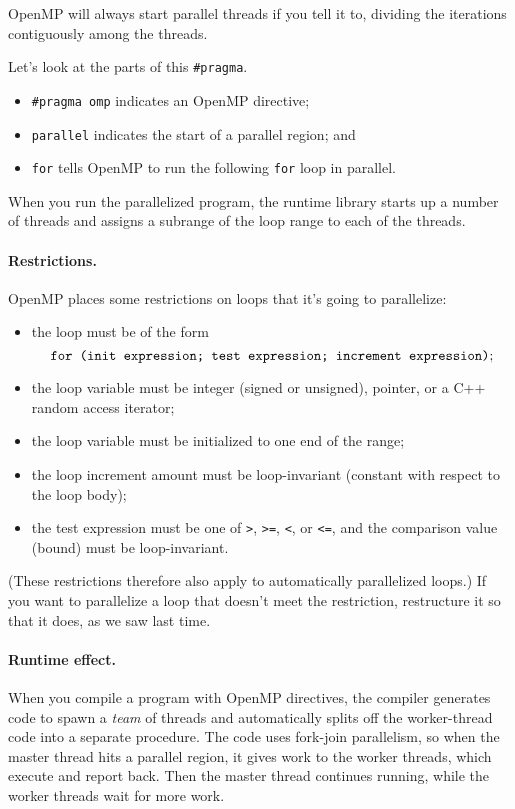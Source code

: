 OpenMP will always start parallel threads if you tell it to, dividing
the iterations contiguously among the threads.

Let's look at the parts of this \verb+#pragma+.
\begin{itemize}
\item \verb+#pragma omp+ indicates an OpenMP directive;
\item {\tt parallel} indicates the start of a parallel region; and
\item {\tt for} tells OpenMP to run the following {\tt for} loop in parallel.
\end{itemize}
When you run the parallelized program, the runtime library starts
up a number of threads and assigns a subrange of the loop range to 
each of the threads.

\paragraph{Restrictions.} OpenMP places some restrictions on
loops that it's going to parallelize:
\begin{itemize}
\item the loop must be of the form 
\[ \mbox{\tt for (init expression; test expression; increment expression)}; \]
\item the loop variable must be integer (signed or unsigned), pointer, or a C++
random access iterator;
\item the loop variable must be initialized to one end of the range;
\item the loop increment amount must be loop-invariant (constant with respect to the loop body); 
\item the test expression must be one of {\tt >}, {\tt >=}, {\tt <}, or {\tt <=}, and the comparison value (bound) must be loop-invariant.
\end{itemize}

(These restrictions therefore also apply to automatically parallelized
loops.) If you want to parallelize a loop that doesn't meet the 
restriction, restructure it so that it does, as we saw last time.

\paragraph{Runtime effect.} When you compile a program with 
OpenMP directives, the compiler generates code to spawn a \emph{team}
of threads and automatically splits off the worker-thread code into a
separate procedure. The code uses fork-join parallelism, so when the
master thread hits a parallel region, it gives work to the worker
threads, which execute and report back. Then the master thread
continues running, while the worker threads wait for more work.

